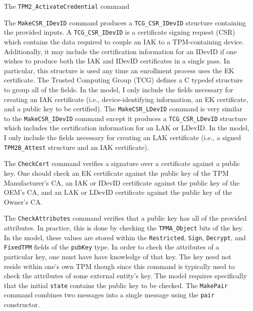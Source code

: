 The \verb|TPM2_ActivateCredential| command


The \verb|MakeCSR_IDevID| command produces a \verb|TCG_CSR_IDevID| structure containing the provided inputs. 
 A \verb|TCG_CSR_IDevID| is a certificate signing request (CSR) which contains the data required to couple an IAK to a TPM-containing device. Additionally, it may include the certification information for an IDevID if one wishes to produce both the IAK and IDevID certificates in a single pass. In particular, this structure is used any time an enrollment process uses the EK certificate. The Trusted Computing Group (TCG) defines a C typedef structure to group all of the fields. In the model, I only include the fields necessary for creating an IAK certificate (i.e., device-identifying information, an EK certificate, and a public key to be certified). The \verb|MakeCSR_LDevID| command is very similar to the \verb|MakeCSR_IDevID| command except it produces a \verb|TCG_CSR_LDevID| structure which includes the certification information for an LAK or LDevID. In the model, I only include the fields necessary for creating an LAK certificate (i.e., a signed \verb|TPM2B_Attest| structure and an IAK certificate).

The \verb|CheckCert| command verifies a signature over a certificate against a public key. One should check an EK certificate against the public key of the TPM Manufacturer's CA, an IAK or IDevID certificate against the public key of the OEM's CA, and an LAK or LDevID certificate against the public key of the Owner's CA.

The \verb|CheckAttributes| command verifies that a public key has all of the provided attributes. In practice, this is done by checking the \verb|TPMA_Object|  bits of the key. In the model, these values are stored within the \verb|Restricted|, \verb|Sign|, \verb|Decrypt|, and \verb|FixedTPM| fields of the \verb|pubKey| type. In order to check the attributes of a particular key, one must have have knowledge of that key. The key need not reside within one's own TPM though since this command is typically used to check the attributes of some external entity's key. The model requires specifically that the initial \verb|state| contains the public key to be checked. The \verb|MakePair| command combines two messages into a single message using the \verb|pair| constructor.









